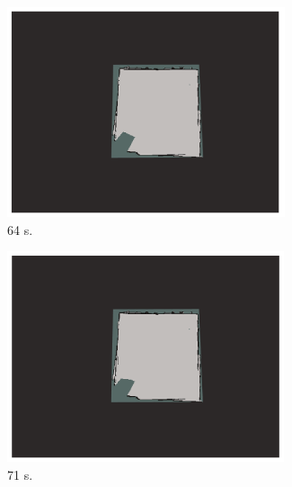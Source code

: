 \documentclass[11pt,openany]{book}
\begin{document}
\begin{algorimth}[H]
\begin{figure}[H]
\begin{subfigure}[H]{0.3\linewidth}
        \includegraphics[width=\linewidth]{assets/4_12_g.png}
        \caption{{64 s.}}
        \label{fig:4.12g}
    \end{subfigure}
    \begin{subfigure}[H]{0.3\linewidth}
        \includegraphics[width=\linewidth]{assets/4_12_h.png}
        \caption{{71 s.}}
        \label{fig:4.12h}
    \end{subfigure}
    \begin{subfigure}[H]{0.3\linewidth}

\end{subfigure}
\end{figure}
\end{algorimth}
\end{document}

